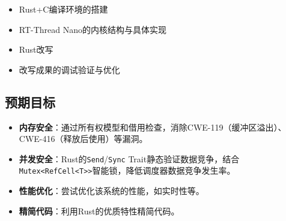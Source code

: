 \begin{itemize}
    \item Rust+C编译环境的搭建
    \item RT-Thread Nano的内核结构与具体实现
    \item Rust改写
    \item 改写成果的调试验证与优化
\end{itemize}

\subsection{预期目标}

\begin{itemize}
    \item \textbf{内存安全}：通过所有权模型和借用检查，消除CWE-119（缓冲区溢出）、CWE-416（释放后使用）等漏洞。
    \item \textbf{并发安全}：Rust的\texttt{Send}/\texttt{Sync} Trait静态验证数据竞争，结合\texttt{Mutex<RefCell<T>>}智能锁，降低调度器数据竞争发生率。
    \item \textbf{性能优化}：尝试优化该系统的性能，如实时性等。
    \item \textbf{精简代码}：利用Rust的优质特性精简代码。
\end{itemize}
